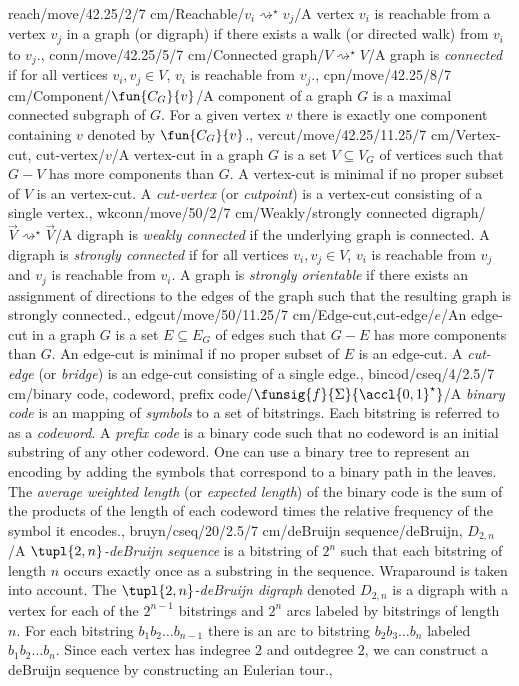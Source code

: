 reach/move/42.25/2/7 cm/{Reachable}/{$v_i\rightsquigarrow^{\star} v_j$}/{A vertex $v_i$ is reachable from a vertex $v_j$ in a graph (or digraph) if there exists a walk (or directed walk) from $v_i$ to $v_j$.},
conn/move/42.25/5/7 cm/{Connected graph}/{$V\rightsquigarrow^{\star}V$}/{A graph is \emph{connected} if for all vertices $v_i,v_j\in V$, $v_i$ is reachable from $v_j$.},
cpn/move/42.25/8/7 cm/{Component}/{$\fun{C_G}{v}$}/{A component of a graph $G$ is a maximal connected subgraph of $G$. For a given vertex $v$ there is exactly one component containing $v$ denoted by $\fun{C_G}{v}$.},
vercut/move/42.25/11.25/7 cm/{Vertex-cut, cut-vertex}/{\Rightscissors$v$}/{A vertex-cut in a graph $G$ is a set $V\subseteq V_G$ of vertices such that $G-V$ has more components than $G$. A vertex-cut is minimal if no proper subset of $V$ is an vertex-cut. A \emph{cut-vertex} (or \emph{cutpoint}) is a vertex-cut consisting of a single vertex.},
wkconn/move/50/2/7 cm/{Weakly/strongly connected digraph}/{$\vec{V}\rightsquigarrow^{\star}\vec{V}$}/{A digraph is \emph{weakly connected} if the underlying graph is connected. A digraph is \emph{strongly connected} if for all vertices $v_i,v_j\in V$, $v_i$ is reachable from $v_j$ and $v_j$ is reachable from $v_i$. A graph is \emph{strongly orientable} if there exists an assignment of directions to the edges of the graph such that the resulting graph is strongly connected.},
edgcut/move/50/11.25/7 cm/{Edge-cut,cut-edge}/{\Rightscissors$e$}/{An edge-cut in a graph $G$ is a set $E\subseteq E_G$ of edges such that $G-E$ has more components than $G$. An edge-cut is minimal if no proper subset of $E$ is an edge-cut. A \emph{cut-edge} (or \emph{bridge}) is an edge-cut consisting of a single edge.},
bincod/cseq/4/2.5/7 cm/{binary code, codeword, prefix code}/{$\funsig{f}{\Sigma}{\accl{0,1}^{\star}}$}/{A \emph{binary code} is an mapping of \emph{symbols} to a set of bitstrings. Each bitstring is referred to as a \emph{codeword}. A \emph{prefix code} is a binary code such that no codeword is an initial substring of any other codeword. One can use a binary tree to represent an encoding by adding the symbols that correspond to a binary path in the leaves. The \emph{average weighted length} (or \emph{expected length}) of the binary code is the sum of the products of the length of each codeword times the relative frequency of the symbol it encodes.},
bruyn/cseq/20/2.5/7 cm/{deBruijn sequence}/{deBruijn, $D_{2,n}$}/{A \emph{$\tupl{2,n}$-deBruijn sequence} is a bitstring of $2^n$ such that each bitstring of length $n$ occurs exactly once as a substring in the sequence. Wraparound is taken into account. The \emph{$\tupl{2,n}$-deBruijn digraph} denoted $D_{2,n}$ is a digraph with a vertex for each of the $2^{n-1}$ bitstrings and $2^n$ arcs labeled by bitstrings of length $n$. For each bitstring $b_1b_2\ldots b_{n-1}$ there is an arc to bitstring $b_2b_3\ldots b_n$ labeled $b_1b_2\ldots b_n$. Since each vertex has indegree $2$ and outdegree $2$, we can construct a deBruijn sequence by constructing an Eulerian tour.},
